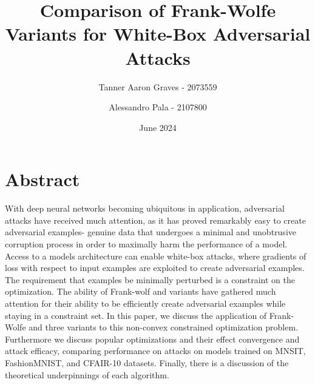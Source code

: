 \documentclass{article}
\title{Comparison of Frank-Wolfe Variants for White-Box Adversarial Attacks}
\author{Tanner Aaron Graves - 2073559\and Alessandro Pala - 2107800}
\date{June 2024}
\begin{document}
\maketitle 
\section{Abstract}
With deep neural networks becoming ubiquitous in application, adversarial attacks have received much attention, as it has proved remarkably easy to create adversarial examples- genuine data that undergoes a minimal and unobtrusive corruption process in order to maximally harm the performance of a model. Access to a models architecture can enable white-box attacks, where gradients of loss with respect to input examples are exploited to create adversarial examples. The requirement that examples be minimally perturbed is a constraint on the optimization. The ability of Frank-wolf and variants have gathered much attention for their ability to be efficiently create adversarial examples while staying in a constraint set. In this paper, we discuss the application of Frank-Wolfe and three variants to this non-convex constrained optimization problem. Furthermore we discuss popular optimizations and their effect convergence and attack efficacy, comparing performance on attacks on models trained on MNSIT, FashionMNIST, and CFAIR-10 datasets. Finally, there is a discussion of the theoretical underpinnings of each algorithm. 
\end{document}
